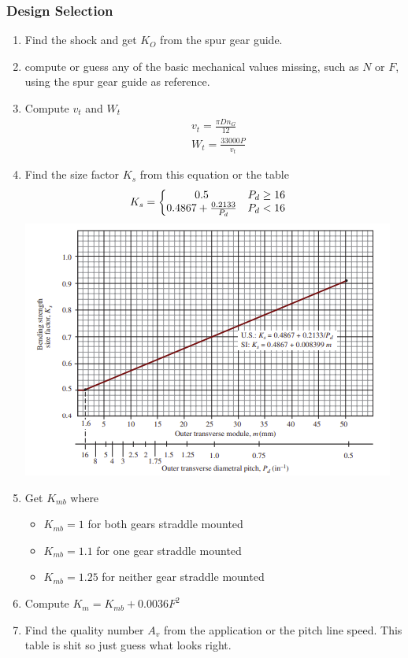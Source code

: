 \documentclass[11pt, fleqn]{article}
\begin{document}
\subsubsection{Design Selection}
\begin{enumerate}
    \item Find the shock and get $K_O$ from the spur gear guide.
    \item compute or guess any of the basic mechanical values missing, such as $N$ or $F$, using the spur gear guide as reference.
    \item Compute $v_t$ and $W_t$
    \begin{align*}
        &v_t=\frac{\pi Dn_G}{12}\\
        &W_t=\frac{33000P}{v_t}
    \end{align*}
    \item Find the size factor $K_s$ from this equation or the table
    \begin{align*}
        &K_s=\left\{\begin{matrix} 0.5 & P_d\geq 16\\ 0.4867+\frac{0.2133}{P_d} & P_d<16 \end{matrix}\right.
    \end{align*}
    \includegraphics[scale=1]{Gears/Fig 10-13.png}
    \item Get $K_{mb}$ where
    \begin{itemize}
        \item $K_{mb}=1$ for both gears straddle mounted
        \item $K_{mb}=1.1$ for one gear straddle mounted
        \item $K_{mb}=1.25$ for neither gear straddle mounted
    \end{itemize}
    \item Compute $K_m=K_{mb}+0.0036F^2$
    \item Find the quality number $A_v$ from the application or the pitch line speed. This table is shit so just guess what looks right.\\

\end{enumerate}
\end{document}
